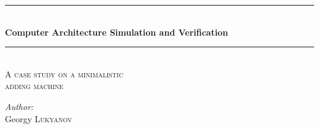 \begin{titlepage}

\newcommand{\HRule}{\rule{\linewidth}{0.5mm}} %

\center %




\HRule \\[0.4cm]
{ \huge \bfseries Computer Architecture Simulation and Verification}\\[0.4cm] %
\HRule \\[1.5cm]

\textsc{\Large A case study on a minimalistic\\ adding machine}\\[0.5cm] %


\begin{minipage}{0.4\textwidth}
\begin{flushleft} \large
\emph{Author:}\\
Georgy \textsc{Lukyanov} %
\end{flushleft}
\end{minipage}
~
\begin{minipage}{0.4\textwidth}
\begin{flushright} \large
\end{flushright}
\end{minipage}
\\[2cm]


\end{titlepage}
